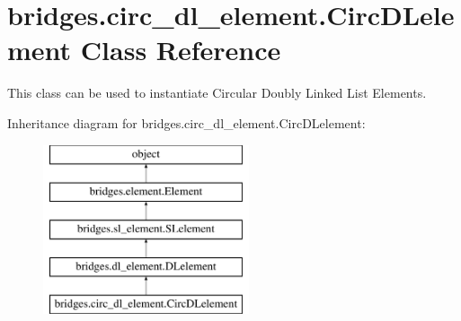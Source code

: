 \hypertarget{classbridges_1_1circ__dl__element_1_1_circ_d_lelement}{}\section{bridges.\+circ\+\_\+dl\+\_\+element.\+Circ\+D\+Lelement Class Reference}
\label{classbridges_1_1circ__dl__element_1_1_circ_d_lelement}


This class can be used to instantiate Circular Doubly Linked List Elements.  


Inheritance diagram for bridges.\+circ\+\_\+dl\+\_\+element.\+Circ\+D\+Lelement\+:\begin{figure}[H]
\begin{center}
\leavevmode
\includegraphics[height=5.000000cm]{classbridges_1_1circ__dl__element_1_1_circ_d_lelement}
\end{center}
\end{figure}

